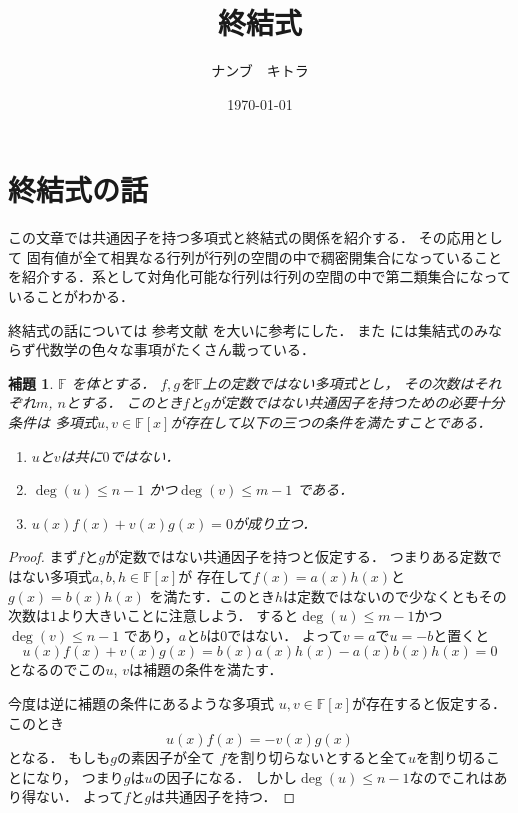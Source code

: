 \documentclass[leqno, a4paper, 12pt]{jsarticle}
\title{終結式}
\author{ナンブ　キトラ}
\date{\today}
\newtheorem{lem}[thm]{補題}
\newcommand{\myfi}{\mathbb{F}}
\begin{document}
\maketitle

\section{終結式の話}


この文章では共通因子を持つ多項式と終結式の関係を紹介する．
その応用として
固有値が全て相異なる行列が行列の空間の中で稠密開集合になっていることを紹介する．系として対角化可能な行列は行列の空間の中で第二類集合になっていることがわかる．

終結式の話については
参考文献 \cite{E}を大いに参考にした．
また
\cite{L}には集結式のみならず代数学の色々な事項がたくさん載っている．


\begin{lem}\label{lem:1111}
$\myfi$
を体とする．
$f, g$を$\myfi$上の定数ではない多項式とし，
その次数はそれぞれ$m$, $n$とする．
このとき$f$と$g$が定数ではない共通因子を持つための必要十分条件は
多項式$u, v\in \myfi[x]$が存在して以下の三つの条件を満たすことである．
\begin{enumerate}
\item 
$u$と$v$は共に$0$ではない．
\item 
$\deg(u)\le n-1$
かつ$\deg(v)\le m-1$
である．
\item 
$u(x)f(x)+v(x)g(x)=0$が成り立つ．
\end{enumerate}
\end{lem}
\begin{proof}
まず$f$と$g$が定数ではない共通因子を持つと仮定する．
つまりある定数ではない多項式$a, b, h\in \myfi[x]$が
存在して$f(x)=a(x)h(x)$と$g(x)=b(x)h(x)$
を満たす．このとき$h$は定数ではないので少なくともその次数は$1$より大きいことに注意しよう．
すると$\deg(u)\le m-1$かつ$\deg(v)\le n-1$
であり，$a$と$b$は$0$ではない．
よって$v=a$で$u=-b$と置くと
\[
u(x)f(x)+v(x)g(x)=b(x)a(x)h(x)-a(x)b(x)h(x)
=0
\]
となるのでこの$u$, $v$は補題の条件を満たす．

今度は逆に補題の条件にあるような多項式
$u, v\in \myfi[x]$が存在すると仮定する．
このとき
\[
u(x)f(x)=-v(x)g(x)
\]
となる．
もしも$g$の素因子が全て
$f$を割り切らないとすると全て$u$を割り切ることになり，
つまり$g$は$u$の因子になる．
しかし$\deg(u)\le n-1$なのでこれはあり得ない．
よって$f$と$g$は共通因子を持つ．
\end{proof}
\end{document}
